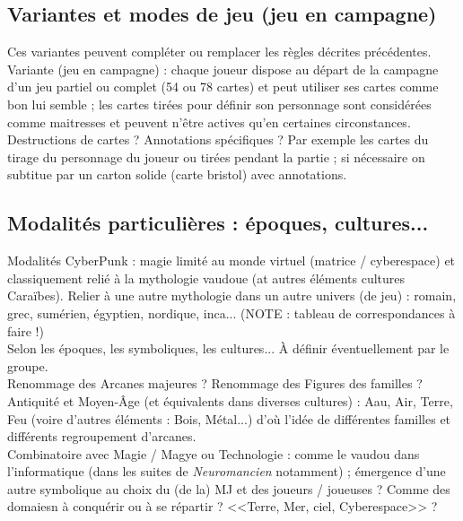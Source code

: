 \documentclass[11pt,twoside,a5paper]{book}
\begin{document}
\subsection{Variantes et modes de jeu (jeu en campagne)}

Ces variantes peuvent compl{\'e}ter ou remplacer les r{\`e}gles d{\'e}crites pr{\'e}c{\'e}dentes.~\\

Variante (jeu en campagne) : chaque joueur dispose au d{\'e}part de la campagne d'un jeu partiel ou complet (54 ou 78 cartes) et peut utiliser ses cartes comme bon lui semble ; les cartes tir{\'e}es pour d{\'e}finir son personnage sont consid{\'e}r{\'e}es comme maitresses et peuvent n'{\^e}tre actives qu'en certaines circonstances.~\\

Destructions de cartes ? Annotations sp{\'e}cifiques ? Par exemple les cartes du tirage du personnage du joueur ou tir{\'e}es pendant la partie ; si n{\'e}cessaire on subtitue par un carton solide (carte bristol) avec annotations. %

\subsection{Modalit{\'e}s particuli{\`e}res : {\'e}poques, cultures...}

Modalit{\'e}s CyberPunk : magie limit{\'e} au monde virtuel (matrice / cyberespace) et classiquement reli{\'e} {\`a} la mythologie vaudoue (at autres {\'e}l{\'e}ments cultures Cara{\"i}bes). 
Relier {\`a} une autre mythologie dans un autre univers (de jeu) : romain, grec, sum{\'e}rien, {\'e}gyptien, nordique, inca... (NOTE : tableau de correspondances {\`a} faire !)~\\

Selon les {\'e}poques, les symboliques, les cultures... {\`A} d{\'e}finir {\'e}ventuellement par le groupe. ~\\

Renommage des Arcanes majeures ? Renommage des Figures des familles ?~\\

Antiquit{\'e} et Moyen-{\^A}ge (et {\'e}quivalents dans diverses cultures) : Aau, Air, Terre, Feu (voire d'autres {\'e}l{\'e}ments : Bois, M{\'e}tal...) d'o{\`u} l'id{\'e}e de diff{\'e}rentes familles et diff{\'e}rents regroupement d'arcanes. ~\\

Combinatoire avec Magie / Magye ou Technologie : comme le vaudou dans l'informatique (dans les suites de \emph{Neuromancien} notamment) ; {\'e}mergence d'une autre symbolique au choix du (de la) MJ et des joueurs / joueuses ? Comme des domaiesn {\`a} conqu{\'e}rir ou {\`a} se r{\'e}partir ? <<Terre, Mer, ciel, Cyberespace>> ?~\\
\end{document}
